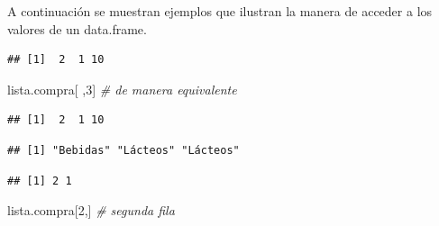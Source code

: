 \documentclass[
]{book}
\newenvironment{Shaded}{\begin{snugshade}}{\end{snugshade}}
\newcommand{\CommentTok}[1]{\textcolor[rgb]{0.56,0.35,0.01}{\textit{#1}}}
\newcommand{\DecValTok}[1]{\textcolor[rgb]{0.00,0.00,0.81}{#1}}
\newcommand{\NormalTok}[1]{#1}
\newcommand{\SpecialCharTok}[1]{\textcolor[rgb]{0.00,0.00,0.00}{#1}}
\theoremstyle{break}
\begin{document}
A continuación se muestran ejemplos que ilustran la manera de acceder
a los valores de un data.frame.

\begin{Shaded}
\end{Shaded}

\begin{verbatim}
## [1]  2  1 10
\end{verbatim}

\begin{Shaded}
\begin{Highlighting}[]
\NormalTok{lista.compra[ ,}\DecValTok{3}\NormalTok{]  }\CommentTok{\# de manera equivalente}
\end{Highlighting}
\end{Shaded}

\begin{verbatim}
## [1]  2  1 10
\end{verbatim}

\begin{Shaded}
\end{Shaded}

\begin{verbatim}
## [1] "Bebidas" "Lácteos" "Lácteos"
\end{verbatim}

\begin{Shaded}
\end{Shaded}

\begin{verbatim}
## [1] 2 1
\end{verbatim}

\begin{Shaded}
\begin{Highlighting}[]
\NormalTok{lista.compra[}\DecValTok{2}\NormalTok{,]  }\CommentTok{\# segunda fila}
\end{Highlighting}
\end{Shaded}
\end{document}
